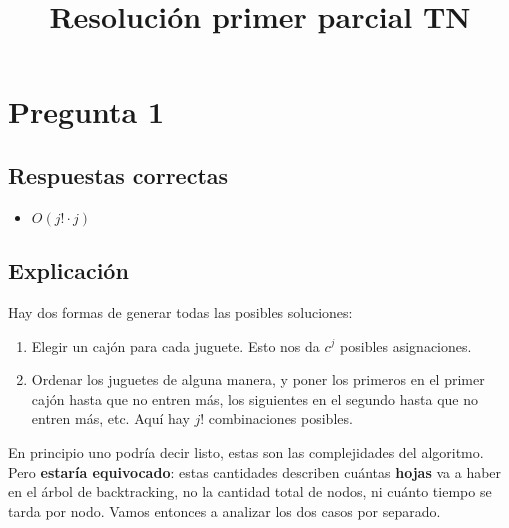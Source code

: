 \documentclass{article}
\begin{document}
\title{Resolución primer parcial TN}
\author{}
\maketitle

\section*{Pregunta 1}
\subsection*{Respuestas correctas}
\begin{itemize}
    \item $O(j! \cdot j)$
\end{itemize}

\subsection*{Explicación}
Hay dos formas de generar todas las posibles soluciones:

\begin{enumerate}
    \item Elegir un cajón para cada juguete. Esto nos da $c^j$ posibles asignaciones.
    \item Ordenar los juguetes de alguna manera, y poner los primeros en el primer cajón hasta que no entren más, los siguientes en el segundo hasta que no entren más, etc. Aquí hay $j!$ combinaciones posibles.
\end{enumerate}

En principio uno podría decir listo, estas son las complejidades del algoritmo. Pero \textbf{estaría equivocado}: estas cantidades describen cuántas \textbf{hojas} va a haber en el árbol de backtracking, no la cantidad total de nodos, ni cuánto tiempo se tarda por nodo. Vamos entonces a analizar los dos casos por separado.
\end{document}
